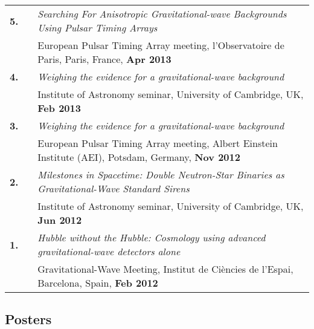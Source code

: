 \documentclass[11pt,letterpaper,sans]{moderncv}
\begin{document}
{\begin{longtable}{rp{0.3cm}p{15.8cm}}
\textbf{5.} & & \textit{Searching For Anisotropic Gravitational-wave Backgrounds Using Pulsar Timing Arrays} \\ 
&& European Pulsar Timing Array meeting, l'Observatoire de Paris, Paris, France, \textbf{Apr 2013} \vspace{0.09cm}\\
\textbf{4.} & & \textit{Weighing the evidence for a gravitational-wave background} \\ 
&& Institute of Astronomy seminar, University of Cambridge, UK, \textbf{Feb 2013} \vspace{0.09cm}\\
\textbf{3.} & & \textit{Weighing the evidence for a gravitational-wave background} \\ 
&& European Pulsar Timing Array meeting, Albert Einstein Institute (AEI), Potsdam, Germany, \textbf{Nov 2012} \vspace{0.09cm}\\
\textbf{2.} & & \textit{Milestones in Spacetime: Double Neutron-Star Binaries as Gravitational-Wave Standard Sirens} \\ 
&& Institute of Astronomy seminar, University of Cambridge, UK, \textbf{Jun 2012} \vspace{0.09cm}\\
\textbf{1.} & & \textit{Hubble without the Hubble: Cosmology using advanced gravitational-wave detectors alone} \\ 
&& Gravitational-Wave Meeting, Institut de Ci\`encies de l'Espai, Barcelona, Spain, \textbf{Feb 2012} 
\end{longtable}
}

\subsection{Posters} \vspace{-0.3cm}

\end{document}
